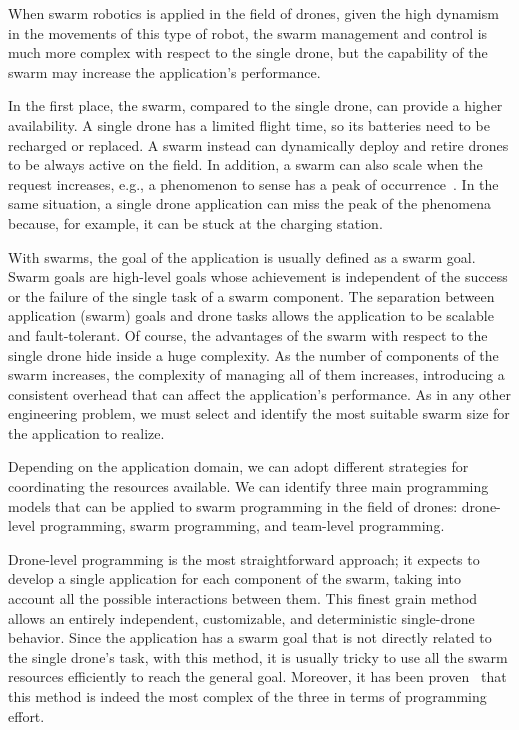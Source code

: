 When swarm robotics is applied in the field of drones, given the high dynamism in the movements of this type of robot, 
the swarm management and control is much more complex with respect to the single drone, 
but the capability of the swarm may increase the application's performance.

In the first place, the swarm, compared to the single drone, can provide a higher availability.
A single drone has a limited flight time, so its batteries need to be recharged or replaced. A swarm instead can dynamically 
deploy and retire drones to be always active on the field. In addition, a swarm can also scale when the request 
increases, e.g., a phenomenon to sense has a peak of occurrence~\cite{dantu2011karma}. 
In the same situation, a single drone application can miss the peak of the phenomena because, for example, it can be stuck at the charging station.

With swarms, the goal of the application is usually defined as a swarm goal.
Swarm goals are high-level goals whose achievement is independent of the success or the failure of the single task of a swarm component.
The separation between application (swarm) goals and drone tasks allows the application to be scalable and fault-tolerant.
Of course, the advantages of the swarm with respect to the single drone hide inside a huge complexity.
As the number of components of the swarm increases, the complexity of managing all of them increases, 
introducing a consistent overhead that can affect the application's performance.
As in any other engineering problem, we must select and identify the most suitable swarm size for the application to realize.

Depending on the application domain, we can adopt different strategies for coordinating the resources available.
We can identify three main programming models that can be applied to swarm programming in the field of drones: drone-level programming, swarm programming, and team-level programming.

Drone-level programming is the most straightforward approach; it expects to develop a single application for each component of the swarm, 
taking into account all the possible interactions between them. 
This finest grain method allows an entirely independent, customizable, and deterministic single-drone behavior. 
Since the application has a swarm goal that is not directly related to the single drone's task, 
with this method, it is usually tricky to use all the swarm resources efficiently to reach the general goal. 
Moreover, it has been proven~\cite{mottola2014team, dantu2011karma} that this method is indeed the most complex of the three in terms of programming effort.

